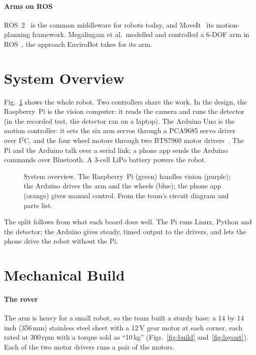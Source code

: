 \documentclass[11pt]{article}
\begin{document}
\paragraph{Arms on ROS} ROS~2~\cite{macenski2022ros2} is the common middleware for robots today, and MoveIt~\cite{coleman2014moveit} its motion-planning framework. Megalingam et al.\ modelled and controlled a 6-DOF arm in ROS~\cite{megalingam2018arm}, the approach EnviroBot takes for its arm.

\section{System Overview}
\label{sec:overview}

Fig.~\ref{fig:overview} shows the whole robot. Two controllers share the work. In the design, the Raspberry~Pi is the vision computer: it reads the camera and runs the detector (in the recorded test, the detector ran on a laptop). The Arduino Uno is the motion controller: it sets the six arm servos through a PCA9685 servo driver~\cite{pca9685} over I$^2$C, and the four wheel motors through two BTS7960 motor drivers~\cite{bts7960}. The Pi and the Arduino talk over a serial link; a phone app sends the Arduino commands over Bluetooth. A 3-cell LiPo battery powers the robot.

\begin{figure}[htbp]
  \centering
  \caption{System overview. The Raspberry~Pi (green) handles vision (purple); the Arduino drives the arm and the wheels (blue); the phone app (orange) gives manual control. From the team's circuit diagram and parts list.}
  \label{fig:overview}
\end{figure}

The split follows from what each board does well. The Pi runs Linux, Python and the detector; the Arduino gives steady, timed output to the drivers, and lets the phone drive the robot without the Pi.

\section{Mechanical Build}
\label{sec:build}

\paragraph{The rover} The arm is heavy for a small robot, so the team built a sturdy base: a 14 by 14 inch (356\,mm) stainless steel sheet with a 12\,V gear motor at each corner, each rated at 300\,rpm with a torque sold as ``10\,kg'' (Figs.~\ref{fig:build} and~\ref{fig:layout}). Each of the two motor drivers runs a pair of the motors.
\end{document}
